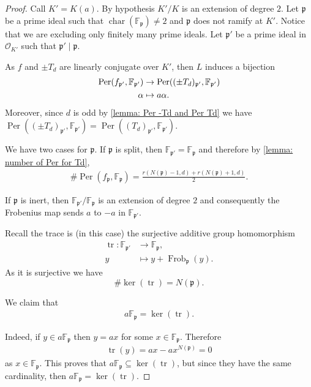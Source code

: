 \documentclass[10pt,a4paper]{amsart}
\DeclareMathOperator{\Frob}{Frob}
\DeclareMathOperator{\Per}{Per}
\DeclareMathOperator{\car}{char}
\DeclareMathOperator{\tr}{tr}
\def\FF{\mathbb F}
\begin{document}
\begin{proof}
Call $K' = K(a)$. By hypothesis $K'/K$ is an extension of degree $2$. Let $\mathfrak{p}$ be a prime ideal such that $\car(\FF_\mathfrak{p}) \neq 2$ and $\mathfrak{p}$ does not ramify at $K'$. Notice that we are excluding only finitely many prime ideals. Let $\mathfrak{p}'$ be a prime ideal in $\mathcal{O}_{K'}$ such that $\mathfrak{p}' \mid \mathfrak{p}$.

As $f$ and $\pm T_d$ are linearly conjugate over $K'$, then $L$ induces a bijection
\begin{align}
\label{equation: bijection Per f and Per Td d odd a not in K}
\Per(f_{\mathfrak{p}'}, \FF_{\mathfrak{p}'}) &\rightarrow  \Per((\pm T_d)_{\mathfrak{p}'}, \FF_{\mathfrak{p}'}) \\
\notag \alpha &\mapsto a \alpha.
\end{align}
Moreover, since $d$ is odd by \cref{lemma: Per -Td and Per Td} we have $\Per((\pm T_d)_{\mathfrak{p}'}, \FF_{\mathfrak{p}'}) = \Per((T_d)_{\mathfrak{p}'}, \FF_{\mathfrak{p}'})$.

We have two cases for $\mathfrak{p}$. If $\mathfrak{p}$ is split, then $\FF_{\mathfrak{p}'} = \FF_\mathfrak{p}$ and therefore by \cref{lemma: number of Per for Td},
\begin{align}
\# \Per(f_\mathfrak{p}, \FF_\mathfrak{p}) = \frac{r(N(\mathfrak{p})-1,d) + r(N(\mathfrak{p})+1,d)}{2}.
\label{equation: Per f in split case}
\end{align}

If $\mathfrak{p}$ is inert, then $\FF_{\mathfrak{p}'}/\FF_\mathfrak{p}$ is an extension of degree $2$ and consequently the Frobenius map sends $a$ to $-a$ in $\FF_\mathfrak{p'}$.

Recall the trace is (in this case) the surjective additive group homomorphism
\begin{align*}
\tr: \FF_{\mathfrak{p}'} &\rightarrow \FF_\mathfrak{p}, \\
y &\mapsto y + \Frob_\mathfrak{p}(y).
\end{align*}
As it is surjective we have $$\# \ker(\tr) = N(\mathfrak{p}).$$

We claim that
\begin{align*}
a \FF_\mathfrak{p} = \ker(\tr).
\end{align*}

Indeed, if $y\in a \FF_\mathfrak{p}$ then $y = ax$ for some $x \in \FF_\mathfrak{p}$. Therefore 
\begin{align*}
\tr(y) = ax -ax^{N(\mathfrak{p})} = 0
\end{align*}
as $x \in \FF_\mathfrak{p}$. This proves that $a\FF_\mathfrak{p} \subseteq \ker(\tr)$, but since they have the same cardinality, then $a\FF_\mathfrak{p} = \ker(\tr)$.


\end{proof}
\end{document}
